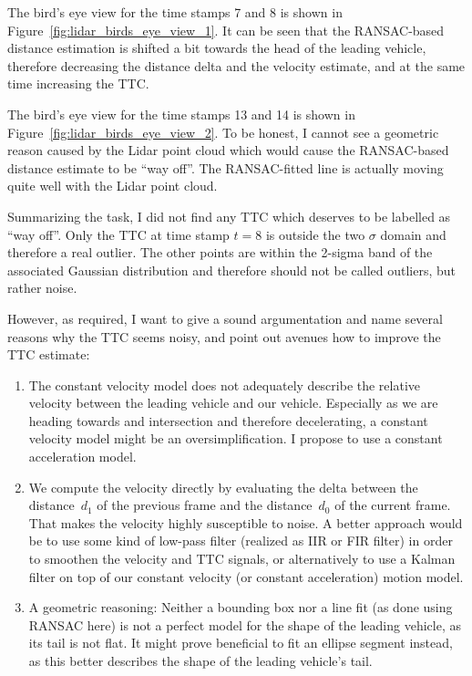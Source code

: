 \documentclass[a4paper]{scrartcl}
\begin{document}
The bird's eye view for the time stamps 7 and 8
is shown in Figure~\ref{fig:lidar_birds_eye_view_1}.
It can be seen that the RANSAC-based distance estimation
is shifted a bit towards the head of the leading
vehicle, therefore decreasing the distance
delta and the velocity estimate, and at the same
time increasing the TTC.

The bird's eye view for the time stamps 13 and 14
is shown in Figure~\ref{fig:lidar_birds_eye_view_2}.
To be honest, I cannot see a geometric reason
caused by the Lidar point cloud which would
cause the RANSAC-based
distance estimate to be ``way off''.
The RANSAC-fitted line is actually moving quite
well with the Lidar point cloud.

Summarizing the task, I did not find any TTC which
deserves to be labelled as ``way off''.
Only the TTC at time stamp $t=8$ is outside the
two $\sigma$ domain and therefore a real outlier.
The other points are within the 2-sigma band of the
associated Gaussian distribution and therefore should not
be called outliers, but rather noise.

However, as required,
I want to give a sound argumentation and
name several reasons why the TTC seems noisy,
and point out avenues how to improve the TTC estimate:
\begin{enumerate}
	\item The constant velocity model does not adequately
		describe the relative velocity between the leading
		vehicle and our vehicle.
		Especially as we are heading towards and intersection
		and therefore decelerating, a constant velocity
		model might be an oversimplification.
		I propose to use a constant acceleration model.
	\item We compute the velocity directly by
		evaluating the delta between the distance~$d_1$
		of the previous frame and the distance~$d_0$
		of the current frame.
		That makes the velocity highly susceptible to noise.
		A better approach would be to use some kind of
		low-pass filter
		(realized as IIR or FIR filter) in order to smoothen the
		velocity and TTC signals, or alternatively
		to use a Kalman filter on top of our
		constant velocity (or constant acceleration)
		motion model.
	\item A geometric reasoning:
		Neither a bounding box nor a line fit
		(as done using RANSAC here) is not a perfect model
		for the shape of the leading vehicle, as its
		tail is not flat.
		It might prove beneficial to fit an ellipse
		segment instead, as this better describes the
		shape of the leading vehicle's tail.
\end{enumerate}
\end{document}
